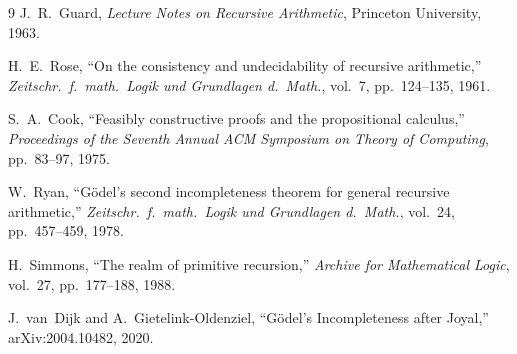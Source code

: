 \documentclass[11pt]{article}
\begin{document}
\begin{thebibliography}{9}
  J.~R.~Guard,
  \emph{Lecture Notes on Recursive Arithmetic},
  Princeton University, 1963.

  H.~E.~Rose,
  ``On the consistency and undecidability of recursive arithmetic,''
  \emph{Zeitschr.\ f.\ math.\ Logik und Grundlagen d.\ Math.},
  vol.~7, pp.~124--135, 1961.

  S.~A.~Cook,
  ``Feasibly constructive proofs and the propositional calculus,''
  \emph{Proceedings of the Seventh Annual ACM Symposium on Theory of Computing},
  pp.~83--97, 1975.

  W.~Ryan,
  ``G\"odel's second incompleteness theorem for general
  recursive arithmetic,''
  \emph{Zeitschr.\ f.\ math.\ Logik und Grundlagen d.\ Math.},
  vol.~24, pp.~457--459, 1978.

  H.~Simmons,
  ``The realm of primitive recursion,''
  \emph{Archive for Mathematical Logic}, vol.~27, pp.~177--188, 1988.

  J.~van~Dijk and A.~Gietelink-Oldenziel,
  ``G\"odel's Incompleteness after Joyal,''
  arXiv:2004.10482, 2020.
\end{thebibliography}
\end{document}

